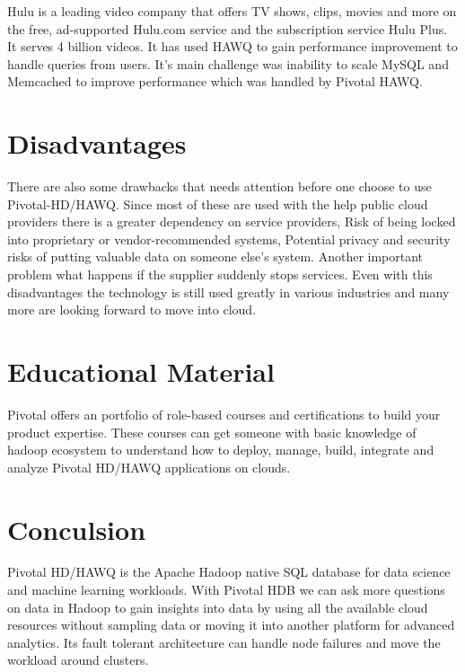 \documentclass[9pt,twocolumn,twoside]{styles/osajnl}
\begin{document}
Hulu is a leading video company that offers TV shows, clips, movies 
and more on the free, ad-supported Hulu.com service and the 
subscription service Hulu Plus. It serves 4 billion videos. It has 
used HAWQ to gain performance improvement to handle queries from 
users. {It's main challenge was inability to scale MySQL and 
Memcached to improve performance which was handled by Pivotal 
HAWQ}\cite{www-pivotal-hulu}.


\section{Disadvantages}

There are also some drawbacks that needs attention before one choose to 
use Pivotal-HD/HAWQ. Since most of these are used with the help 
public cloud providers there is a greater dependency on service 
providers, 
Risk of being locked into proprietary or vendor-recommended systems, 
Potential privacy and security risks of putting valuable data on someone else's system. 
Another important problem what happens if the supplier suddenly stops 
services. Even with this disadvantages the technology is still used 
greatly in various industries and many more are looking forward to 
move into cloud.

\section{Educational Material}

{Pivotal offers an portfolio of role-based courses and certifications 
to build your product expertise}\cite{www-pivotal-courses}. These 
courses can get someone with basic knowledge of hadoop ecosystem  to 
understand how to deploy, manage, build, integrate and analyze 
Pivotal HD/HAWQ applications on clouds. 

\section{Conculsion}

Pivotal HD/HAWQ is the Apache Hadoop native SQL database for data 
science and machine learning workloads. With Pivotal HDB we can ask 
more questions on data in Hadoop to gain insights into data by using 
all the available cloud resources without sampling data or moving it 
into another platform for advanced analytics. Its fault tolerant 
architecture can handle node failures and move the workload around 
clusters.


\end{document}
